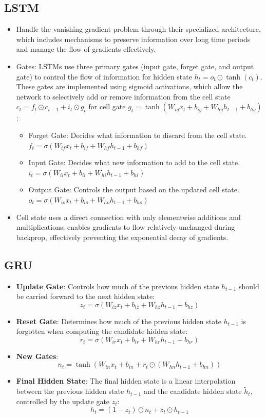 \documentclass[12pt,a4paper]{article}
\begin{document}
\subsection{LSTM}
\begin{itemize}
    \item  Handle the vanishing gradient problem through their specialized architecture, which includes mechanisms to preserve information over long time periods and manage the flow of gradients effectively.
    \item Gates: LSTMs use three primary gates (input gate, forget gate, and output gate) to control the flow of information for hidden state $h_t = o_t \odot \tanh(c_t)$. These gates are implemented using sigmoid activations, which allow the network to selectively add or remove information from the cell state $c_t = f_t \odot c_{t-1} + i_t \odot g_t$ for cell gate $g_t = \tanh(W_{ig}x_t + b_{ig} + W_{hg}h_{t-1} + b_{hg})$:
    \begin{itemize}
        \item Forget Gate: Decides what information to discard from the cell state. $f_t = \sigma(W_{if}x_t + b_{if} + W_{hf}h_{t-1} + b_{hf})$
        \item Input Gate: Decides what new information to add to the cell state. $i_t = \sigma(W_{ii}x_t + b_{ii} + W_{hi}h_{t-1} + b_{hi})$ 
        \item Output Gate: Controls the output based on the updated cell state. $o_t = \sigma(W_{io}x_t + b_{io} + W_{ho}h_{t-1} + b_{ho})$
    \end{itemize}
    \item Cell state uses a direct connection with only elementwise additions and multiplications; enables gradients to flow relatively unchanged during backprop, effectively preventing the exponential decay of gradients.

\end{itemize}
\subsection{GRU} 
\begin{itemize}
    \item \textbf{Update Gate}: Controls how much of the previous hidden state \( h_{t-1} \) should be carried forward to the next hidden state:
    \[z_t = \sigma(W_{iz}x_t + b_{iz} + W_{hz}h_{t-1} + b_{hz})\]

    \item \textbf{Reset Gate}: Determines how much of the previous hidden state \( h_{t-1} \) is forgotten when computing the candidate hidden state:
    \[r_t = \sigma(W_{ir}x_t + b_{ir} + W_{hr}h_{t-1} + b_{hr})\]

    \item \textbf{New Gates}: 
    \[n_t = \tanh(W_{in}x_t + b_{in} + r_t \odot (W_{hn}h_{t-1} + b_{hn}))\]

    \item \textbf{Final Hidden State}: The final hidden state is a linear interpolation between the previous hidden state \( h_{t-1} \) and the candidate hidden state \( \tilde{h}_t \), controlled by the update gate \( z_t \):
    \[h_t = (1 - z_t) \odot n_t + z_t \odot h_{t-1}\]
\end{itemize}
\end{document}
